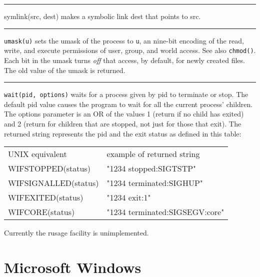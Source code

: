 \bigskip\hrule\vspace{0.1cm}

\noindent
{}symlink(src, dest) makes a symbolic link dest
that points to src.

\bigskip\hrule\vspace{0.1cm}

\noindent
\texttt{umask(u)} sets the umask of the process to \texttt{u}, an nine-bit
encoding of the read, write, and execute permissions of user,
group, and world access. See also \texttt{chmod()}. Each bit in the umask turns
\textit{off} that access, by default, for newly created files. The old
value of the umask is returned.

\bigskip\hrule\vspace{0.1cm}

\noindent
\texttt{wait(pid, options)} waits for a process given by pid to terminate or
stop. The default pid value causes the program to wait for all the
current process' children. The options parameter is an
OR of the values 1 (return if no child has exited) and 2 (return for
children that are stopped, not just for those that exit). The returned
string represents the pid and the exit status as defined in this table:

\vspace{0.05in}
\begin{center}
\begin{xtabular}{m{2.4in} m{2.6in}}
 UNIX equivalent & example of returned string \\
 WIFSTOPPED(status) & "1234 stopped:SIGTSTP" \\
 WIFSIGNALLED(status) & "1234 terminated:SIGHUP" \\
 WIFEXITED(status) & "1234 exit:1" \\
 WIFCORE(status) & "1234 terminated:SIGSEGV:core" \\
\end{xtabular}
\end{center}
\vspace{0.05in}

\noindent
Currently the \textsf{rusage} facility is unimplemented.


\section{Microsoft Windows}

